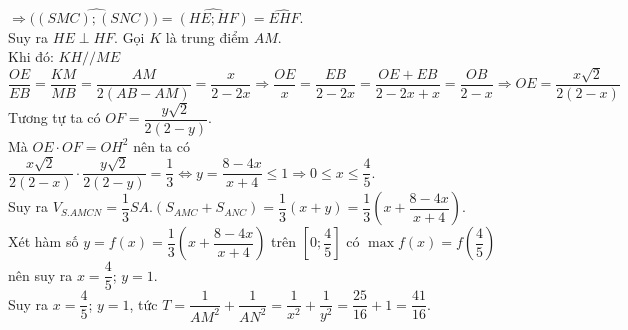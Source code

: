 \begin{ex}
{		$\Rightarrow(\widehat{(S M C) ;(S N C))}=\widehat{(H E; H F)}=\widehat{E H F}$.\\
		Suy ra $H E\perp H F$. Gọi $K$ là trung điểm $A M$. \\
		Khi đó: $KH // ME$\\
		$\dfrac{O E}{E B}=\dfrac{K M}{M B}=\dfrac{A M}{2(A B-A M)}=\dfrac{x}{2-2 x}\Rightarrow\dfrac{O E}{x}=\dfrac{E B}{2-2 x}=\dfrac{O E+E B}{2-2 x+x}=\dfrac{O B}{2-x}\Rightarrow O E=\dfrac{x\sqrt{2}}{2(2-x)}$
		Tương tự ta có $O F=\dfrac{y\sqrt{2}}{2(2-y)}$.\\
		Mà $O E \cdot O F=O H^2$ nên ta có $\dfrac{x\sqrt{2}}{2(2-x)}\cdot\dfrac{y\sqrt{2}}{2(2-y)}=\dfrac{1}{3}\Leftrightarrow y=\dfrac{8-4 x}{x+4}\leq 1\Rightarrow 0\leq x\leq\dfrac{4}{5}$.\\
		Suy ra $V_{S . A M C N}=\dfrac{1}{3}S A .\left(S_{A M C}+S_{A N C}\right)=\dfrac{1}{3}(x+y)=\dfrac{1}{3}\left(x+\dfrac{8-4 x}{x+4}\right)$.\\
		Xét hàm số $y=f(x)=\dfrac{1}{3}\left(x+\dfrac{8-4 x}{x+4}\right)$ trên $\left[0 ;\dfrac{4}{5}\right]$ có $\max f(x)=f\left(\dfrac{4}{5}\right)$ nên suy ra $x=\dfrac{4}{5}$; $y=1$.\\
		Suy ra $x=\dfrac{4}{5}$; $y=1$, tức $T=\dfrac{1}{A M^2}+\dfrac{1}{A N^2}=\dfrac{1}{x^2}+\dfrac{1}{y^2}=\dfrac{25}{16}+1=\dfrac{41}{16}$.
	}
\end{ex}

